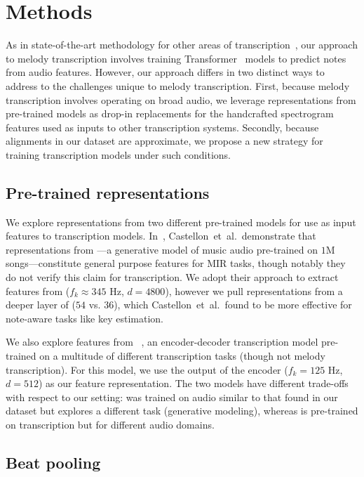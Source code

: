 \section{Methods}

As in state-of-the-art methodology for other areas of transcription~\cite{hawthorne2021sequence}, 
our approach to melody transcription involves training Transformer~\cite{vaswani2017attention} models to predict notes from audio features. 
However, our approach differs in two distinct ways to address to the challenges unique to melody transcription.
First, because melody transcription involves operating on broad audio, we leverage representations from pre-trained models as drop-in replacements for the handcrafted spectrogram features used as inputs to other transcription systems. 
Secondly, because alignments in our dataset are approximate, we propose a new strategy for training transcription models under such conditions.

\subsection{Pre-trained representations}
\label{sec:representations}

We explore representations from two different pre-trained models for use as input features to transcription models.
In~\cite{castellon2021calm}, Castellon~et~al.\ demonstrate that representations from \jukebox---a generative model of music audio pre-trained on $1$M songs---constitute general purpose features for MIR tasks, though notably they do not verify this claim for transcription. 
We adopt their approach to extract features from \jukebox{} ($f_k \approx 345$ Hz, $d = 4800$), however we pull representations from a deeper layer of \jukebox{} ($54$ vs. $36$), which Castellon~et~al.\ found to be more effective for note-aware tasks like key estimation. 

We also explore features from \mtthree~\cite{gardner2021mt3}, an encoder-decoder transcription model pre-trained on a multitude of different transcription tasks (though not melody transcription). 
For this model, we use the output of the encoder ($f_k = 125$ Hz, $d = 512$) as our feature representation. 
The two models have different trade-offs with respect to our setting: \jukebox{} was trained on audio similar to that found in our dataset but explores a different task (generative modeling), whereas \mtthree{} is pre-trained on transcription but for different audio domains. 

\subsection{Beat pooling}
\label{sec:beatpool}

